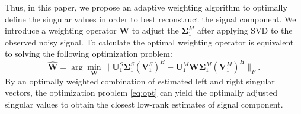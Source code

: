 Thus, in this paper, we propose an adaptive weighting algorithm to optimally define the singular values in order to best reconstruct the signal component. We introduce a weighting operator $\mathbf{W}$ to adjust the $\boldsymbol{\Sigma}_1^M$ after applying SVD to the observed noisy signal. To calculate the optimal weighting operator is equivalent to solving the following optimization problem:
\begin{equation}
\label{eq:opt}
\hat{\mathbf{W}} = \arg \min_{\mathbf{W}} \parallel \mathbf{U}_1^S\boldsymbol{\Sigma}_1^S(\mathbf{V}_1^S)^H - \mathbf{U}_1^M\mathbf{W}\boldsymbol{\Sigma}_1^M(\mathbf{V}_1^M)^H \parallel_F.
\end{equation}
By an optimally weighted combination of estimated left and right singular vectors, the optimization problem \ref{eq:opt} can yield the optimally adjusted singular values to obtain the closest low-rank estimates of signal component. 

